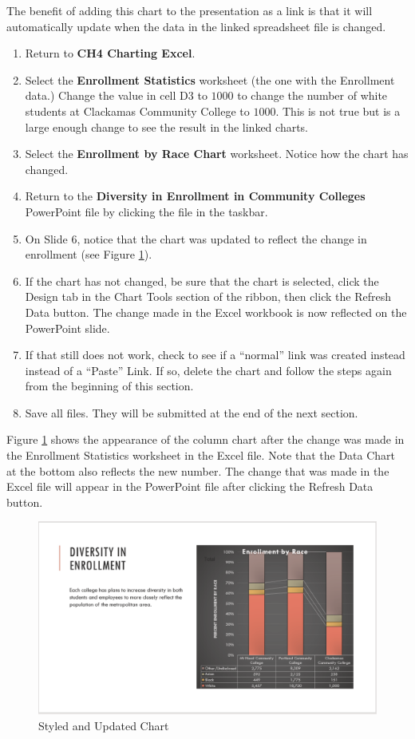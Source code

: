 The benefit of adding this chart to the presentation as a link is that it will automatically update when the data in the linked spreadsheet file is changed.

\begin{enumerate}
	\item Return to \textbf{CH4 Charting Excel}.
	\item Select the \textbf{Enrollment Statistics} worksheet (the one with the Enrollment data.) Change the value in cell \textsf{D3} to $ 1000 $ to change the number of white students at Clackamas Community College to $ 1000 $. This is not true but is a large enough change to see the result in the linked charts.
	\item Select the \textbf{Enrollment by Race Chart} worksheet. Notice how the chart has changed.
	\item Return to the \textbf{Diversity in Enrollment in Community Colleges} PowerPoint file by clicking the file in the taskbar.
	\item On Slide $ 6 $, notice that the chart was updated to reflect the change in enrollment (see Figure \ref{04:fig48}).
	\item If the chart has not changed, be sure that the chart is selected, click the Design tab in the Chart Tools section of the ribbon, then click the Refresh Data button. The change made in the Excel workbook is now reflected on the PowerPoint slide.
	\item If that still does not work, check to see if a ``normal'' link was created instead instead of a ``Paste'' Link. If so, delete the chart and follow the steps again from the beginning of this section.
	\item Save all files. They will be submitted at the end of the next section.
\end{enumerate}

Figure \ref{04:fig48} shows the appearance of the column chart after the change was made in the Enrollment Statistics worksheet in the Excel file. Note that the Data Chart at the bottom also reflects the new number. The change that was made in the Excel file will appear in the PowerPoint file after clicking the Refresh Data button.

\begin{figure}[H]
	\centering
	\includegraphics[width=\maxwidth{.95\linewidth}]{gfx/ch04_fig48}
	\caption{Styled and Updated Chart}
	\label{04:fig48}
\end{figure}

